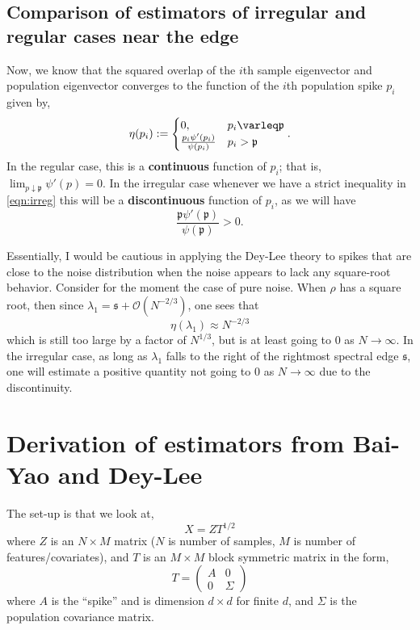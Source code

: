 \documentclass[11 pt, reqno]{article}
\def\beq{\begin{equation}}
\def\eeq{\end{equation}}
\def\mfp{\mathfrak{p}}
\def\mfs{\mathfrak{s}}
\renewcommand\leq\varleq
\def\O{\mathcal{O}}
\begin{document}
\subsection{Comparison of estimators of irregular and regular cases near the edge}

Now, we know that the  squared overlap of the $i$th sample eigenvector and population eigenvector converges to the function of the $i$th population spike $p_i$ given by,
\beq
\eta (p_i ) := \begin{cases} 0 ,  & p_i \leq \mfp \\
\frac{p_i \psi' ( p_i  ) }{ \psi ( p_i ) } & p_i > \mfp \end{cases}.
\eeq
In the regular case, this is a {\bf continuous } function of $p_i$; that is, $\lim_{p \downarrow \mfp } \psi' (p) = 0$.  In the irregular case whenever we have a strict inequality in \eqref{eqn:irreg} this will be a {\bf discontinuous} function of $p_i$, as we will have
\beq
\frac{ \mfp  \psi' ( \mfp ) }{ \psi ( \mfp ) } > 0 .
\eeq

Essentially, I would be cautious in applying the Dey-Lee theory to spikes that are close to the noise distribution when the noise appears to lack any square-root behavior.  Consider for the moment the case of pure noise.  When $\rho$ has a square root, then since $\lambda_1 = \mfs + \O ( N^{-2/3} )$, one sees that 
\beq
\eta ( \lambda_1 ) \approx N^{-2/3}
\eeq
which is still too large by a factor of $N^{1/3}$, but is at least going to $0$ as $N \to \infty$.  In the irregular case, as long as $\lambda_1$ falls to the right of the rightmost spectral edge $\mfs$, one will estimate a positive quantity not going to $0$ as $N \to \infty$ due to the discontinuity.  

\section{Derivation of estimators from Bai-Yao and Dey-Lee}

\label{sec:estimators}
The set-up is that we look at,
\beq
X = Z T^{1/2} 
\eeq
where $Z$ is an $N \times M$ matrix ($N$ is number of samples, $M$ is number of features/covariates), and $T$ is an $M \times M$ block symmetric matrix in the form,
\beq
T = \left( \begin{matrix} A & 0 \\ 0 & \Sigma \end{matrix} \right)
\eeq
where $A$ is the ``spike'' and is dimension $d \times d$ for finite $d$, and $\Sigma$ is the population covariance matrix.
\end{document}
